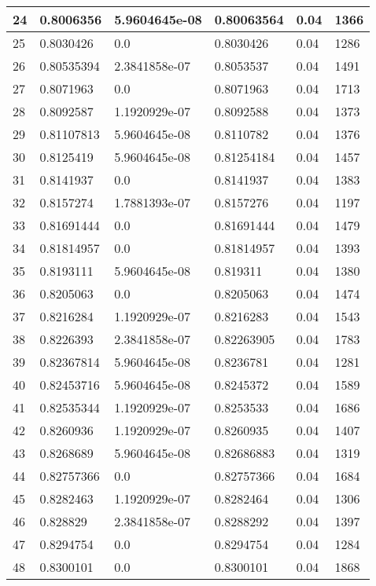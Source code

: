 \begin{longtable}{|l|l|l|l|l|l|}
24 & 0.8006356 & 5.9604645e-08 & 0.80063564 & 0.04 & 1366 \\ \hline 
25 & 0.8030426 & 0.0 & 0.8030426 & 0.04 & 1286 \\ \hline 
26 & 0.80535394 & 2.3841858e-07 & 0.8053537 & 0.04 & 1491 \\ \hline 
27 & 0.8071963 & 0.0 & 0.8071963 & 0.04 & 1713 \\ \hline 
28 & 0.8092587 & 1.1920929e-07 & 0.8092588 & 0.04 & 1373 \\ \hline 
29 & 0.81107813 & 5.9604645e-08 & 0.8110782 & 0.04 & 1376 \\ \hline 
30 & 0.8125419 & 5.9604645e-08 & 0.81254184 & 0.04 & 1457 \\ \hline 
31 & 0.8141937 & 0.0 & 0.8141937 & 0.04 & 1383 \\ \hline 
32 & 0.8157274 & 1.7881393e-07 & 0.8157276 & 0.04 & 1197 \\ \hline 
33 & 0.81691444 & 0.0 & 0.81691444 & 0.04 & 1479 \\ \hline 
34 & 0.81814957 & 0.0 & 0.81814957 & 0.04 & 1393 \\ \hline 
35 & 0.8193111 & 5.9604645e-08 & 0.819311 & 0.04 & 1380 \\ \hline 
36 & 0.8205063 & 0.0 & 0.8205063 & 0.04 & 1474 \\ \hline 
37 & 0.8216284 & 1.1920929e-07 & 0.8216283 & 0.04 & 1543 \\ \hline 
38 & 0.8226393 & 2.3841858e-07 & 0.82263905 & 0.04 & 1783 \\ \hline 
39 & 0.82367814 & 5.9604645e-08 & 0.8236781 & 0.04 & 1281 \\ \hline 
40 & 0.82453716 & 5.9604645e-08 & 0.8245372 & 0.04 & 1589 \\ \hline 
41 & 0.82535344 & 1.1920929e-07 & 0.8253533 & 0.04 & 1686 \\ \hline 
42 & 0.8260936 & 1.1920929e-07 & 0.8260935 & 0.04 & 1407 \\ \hline 
43 & 0.8268689 & 5.9604645e-08 & 0.82686883 & 0.04 & 1319 \\ \hline 
44 & 0.82757366 & 0.0 & 0.82757366 & 0.04 & 1684 \\ \hline 
45 & 0.8282463 & 1.1920929e-07 & 0.8282464 & 0.04 & 1306 \\ \hline 
46 & 0.828829 & 2.3841858e-07 & 0.8288292 & 0.04 & 1397 \\ \hline 
47 & 0.8294754 & 0.0 & 0.8294754 & 0.04 & 1284 \\ \hline 
48 & 0.8300101 & 0.0 & 0.8300101 & 0.04 & 1868 \\ \hline 

\end{longtable}
